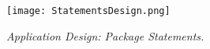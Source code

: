 
\begin{figure}[H]
	\centering
	\texttt{[image: StatementsDesign.png]}
	\caption{\small{\textit{Application Design: Package Statements.}}}
\end{figure}